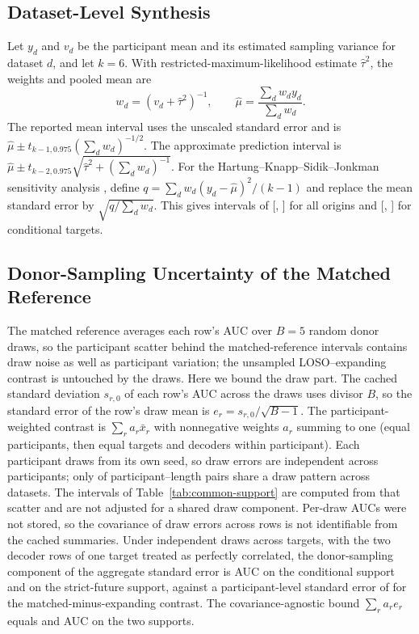 \documentclass{ieeeaccess}
\begin{document}
\subsection{Dataset-Level Synthesis}
Let $y_d$ and $v_d$ be the participant mean and its estimated sampling variance
for dataset $d$, and let $k=6$. With restricted-maximum-likelihood estimate
$\widehat\tau^2$, the weights and pooled mean are
\begin{equation}
w_d=(v_d+\widehat\tau^2)^{-1},\qquad
\widehat\mu=\frac{\sum_d w_d y_d}{\sum_d w_d}.
\end{equation}
The reported mean interval uses the unscaled standard error and is
$\widehat\mu\pm t_{k-1,0.975}(\sum_d w_d)^{-1/2}$. The approximate prediction
interval \cite{higgins2009reevaluation} is
$\widehat\mu\pm t_{k-2,0.975}
\sqrt{\widehat\tau^2+(\sum_d w_d)^{-1}}$.
For the Hartung--Knapp--Sidik--Jonkman sensitivity analysis
\cite{rover2015hartung}, define
$q=\sum_d w_d(y_d-\widehat\mu)^2/(k-1)$ and replace the mean standard error
by $\sqrt{q/\sum_d w_d}$. This gives intervals of
[\AllMetaHKLo{}, \AllMetaHKHi{}] for all origins and
[\CondMetaHKLo{}, \CondMetaHKHi{}] for conditional targets.

\subsection{Donor-Sampling Uncertainty of the Matched Reference}
The matched reference averages each row's AUC over $B=5$ random donor draws, so
the participant scatter behind the matched-reference intervals contains draw
noise as well as participant variation; the unsampled LOSO--expanding contrast
is untouched by the draws. Here we bound the draw part. The cached
standard deviation $s_{r,0}$ of each row's AUC across the draws uses divisor
$B$, so the standard error of the row's draw mean is $e_r=s_{r,0}/\sqrt{B-1}$. The participant-weighted contrast is $\sum_r a_r
\bar x_r$ with nonnegative weights $a_r$ summing to one (equal participants,
then equal targets and decoders within participant). Each participant draws
from its own seed, so draw errors are independent across participants; only
\SharedSeedPairs{} of \SubjectTPairs{} participant--length pairs share a draw
pattern across datasets. The intervals of Table~\ref{tab:common-support} are
computed from that scatter and are not adjusted for a shared draw component. Per-draw AUCs were
not stored, so the covariance of draw errors across rows is not identifiable
from the cached summaries. Under
independent draws across targets, with the two decoder rows of one target
treated as perfectly correlated, the donor-sampling component of the aggregate
standard error is \CondCompDrawSE{} AUC on the conditional support and
\StrictCompDrawSE{} on the strict-future support, against a participant-level
standard error of \CondCompParticipantSE{} for the matched-minus-expanding
contrast. The covariance-agnostic bound $\sum_r a_r e_r$ equals
\CondMatchedTriangleSE{} and \StrictMatchedTriangleSE{} AUC on the two
supports.
\end{document}
